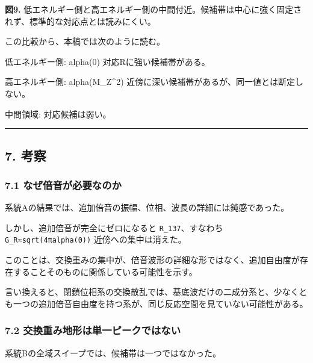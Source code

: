 \documentclass[
]{article}
\newenvironment{Shaded}{}{}
\newcommand{\NormalTok}[1]{#1}
\begin{document}
\textbf{図9.}
低エネルギー側と高エネルギー側の中間付近。候補帯は中心に強く固定されず、標準的な対応点とは読みにくい。

この比較から、本稿では次のように読む。

\begin{Shaded}
\begin{Highlighting}[]
\NormalTok{低エネルギー側:}
\NormalTok{  alpha(0) 対応Rに強い候補帯がある。}

\NormalTok{高エネルギー側:}
\NormalTok{  alpha(M\_Z\^{}2) 近傍に深い候補帯があるが、同一値とは断定しない。}

\NormalTok{中間領域:}
\NormalTok{  対応候補は弱い。}
\end{Highlighting}
\end{Shaded}

\begin{center}\rule{0.5\linewidth}{0.5pt}\end{center}

\subsection{7. 考察}\label{ux8003ux5bdf}

\subsubsection{7.1
なぜ倍音が必要なのか}\label{ux306aux305cux500dux97f3ux304cux5fc5ux8981ux306aux306eux304b}

系統Aの結果では、追加倍音の振幅、位相、波長の詳細には鈍感であった。

しかし、追加倍音が完全にゼロになると \texttt{R\_137}、すなわち
\texttt{G\_R≈sqrt(4πalpha(0))} 近傍への集中は消えた。

このことは、交換重みの集中が、倍音波形の詳細な形ではなく、追加自由度が存在することそのものに関係している可能性を示す。

言い換えると、閉鎖位相系の交換散乱では、基底波だけの二成分系と、少なくとも一つの追加倍音自由度を持つ系が、同じ反応空間を見ていない可能性がある。

\subsubsection{7.2
交換重み地形は単一ピークではない}\label{ux4ea4ux63dbux91cdux307fux5730ux5f62ux306fux5358ux4e00ux30d4ux30fcux30afux3067ux306fux306aux3044}

系統Bの全域スイープでは、候補帯は一つではなかった。
\end{document}
